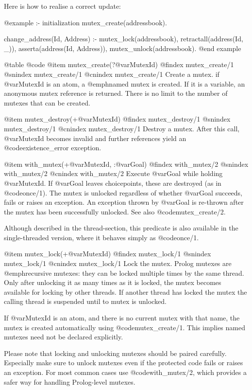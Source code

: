 {{{{{{{{{Here is how to realise a correct update:

@example
:- initialization
	mutex_create(addressbook).

change_address(Id, Address) :-
	mutex_lock(addressbook),
	retractall(address(Id, _)),
	asserta(address(Id, Address)),
	mutex_unlock(addressbook).
@end example


@table @code
@item mutex_create(?@var{MutexId})
@findex mutex_create/1
@snindex mutex_create/1
@cnindex mutex_create/1
Create a mutex.  if @var{MutexId} is an atom, a @emph{named} mutex is
created.  If it is a variable, an anonymous mutex reference is returned.
There is no limit to the number of mutexes that can be created.

@item mutex_destroy(+@var{MutexId})
@findex mutex_destroy/1
@snindex mutex_destroy/1
@cnindex mutex_destroy/1
Destroy a mutex.  After this call, @var{MutexId} becomes invalid and
further references yield an @code{existence_error} exception.

@item with_mutex(+@var{MutexId}, :@var{Goal})
@findex with_mutex/2
@snindex with_mutex/2
@cnindex with_mutex/2
Execute @var{Goal} while holding @var{MutexId}.  If @var{Goal} leaves
choicepoints, these are destroyed (as in @code{once/1}).  The mutex is unlocked
regardless of whether @var{Goal} succeeds, fails or raises an exception.
An exception thrown by @var{Goal} is re-thrown after the mutex has been
successfully unlocked.  See also @code{mutex_create/2}.

Although described in the thread-section, this predicate is also
available in the single-threaded version, where it behaves simply as
@code{once/1}.

@item mutex_lock(+@var{MutexId})
@findex mutex_lock/1
@snindex mutex_lock/1
@cnindex mutex_lock/1
Lock the mutex.  Prolog mutexes are @emph{recursive} mutexes: they
can be locked multiple times by the same thread.  Only after unlocking
it as many times as it is locked, the mutex becomes available for
locking by other threads. If another thread has locked the mutex the
calling thread is suspended until to mutex is unlocked.

If @var{MutexId} is an atom, and there is no current mutex with that
name, the mutex is created automatically using @code{mutex_create/1}.  This
implies named mutexes need not be declared explicitly.

Please note that locking and unlocking mutexes should be paired
carefully. Especially make sure to unlock mutexes even if the protected
code fails or raises an exception. For most common cases use
@code{with_mutex/2}, which provides a safer way for handling Prolog-level
mutexes.

}}}}}}}}}
